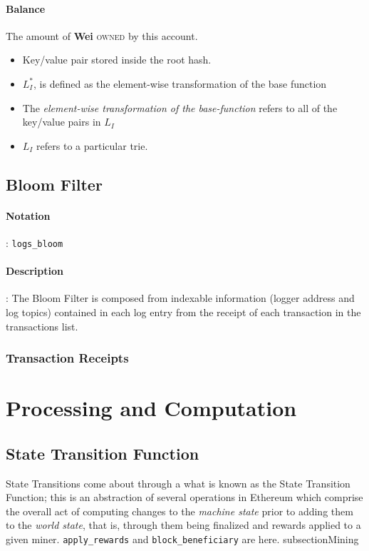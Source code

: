 \documentclass[10pt,a4paper,leqno,bibliography=totoc]{scrartcl}
\newenvironment{alphafootnotes}
{\par\edef\savedfootnotenumber{\number\value{footnote}}
\renewcommand{\thefootnote}{\alph{footnote}}
\setcounter{footnote}{0}}
{\par\setcounter{footnote}{\savedfootnotenumber}}
\begin{document}
\begin{alphafootnotes}
\begin{multicols*}{2}
    				\paragraph{Balance}
    					The amount of \textbf{Wei} \textsc{owned} by this account. 
					    \begin{itemize}
				            \item Key/value pair stored inside the root hash. 
					    \item $L_I^*$, is defined as the element-wise transformation of the base function
					    \item The \textsl{element-wise transformation of the base-function} refers to all of the key/value pairs in \textit{$L_I$}
					    \item $L_I$ refers to a particular \gls{trie}.
					    \end{itemize}

   		\subsection{Bloom Filter}
				\paragraph{Notation}: \texttt{logs\_bloom}
				\paragraph{Description}: The Bloom Filter is composed from indexable information (logger address and log topics) contained in each log entry from the receipt of each transaction in the transactions list. 

		\subsubsection{Transaction Receipts}


	\section{Processing and Computation}
	
		\subsection{State Transition Function}
		State Transitions come about through a what is known as the State Transition Function; this is an abstraction of several operations in Ethereum which comprise the overall act of computing changes to the \textit{machine state} prior to adding them to the \textit{world state}, that is, through them being finalized and rewards applied to a given miner. \texttt{apply\_rewards} and \texttt{block\_beneficiary} are here.
		subsection{Mining}

\end{multicols*}
\end{alphafootnotes}
\end{document}
